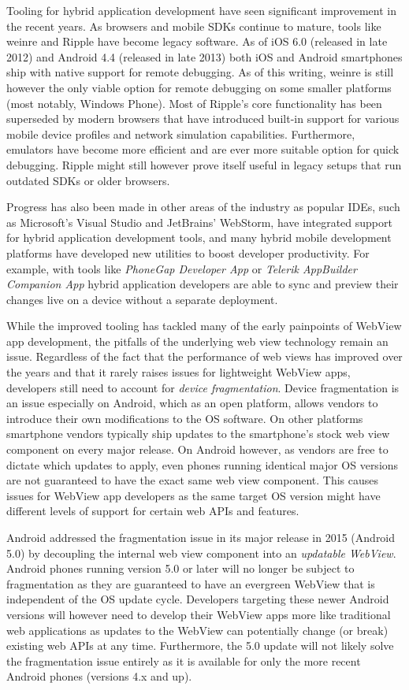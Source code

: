 \documentclass[thesis.tex]{subfiles}
\begin{document}
Tooling for hybrid application development have seen significant improvement in the recent years. As browsers and mobile SDKs continue to mature, tools like weinre and Ripple have become legacy software. As of iOS 6.0 (released in late 2012) and Android 4.4 (released in late 2013) both iOS and Android smartphones ship with native support for remote debugging. As of this writing, weinre is still however the only viable option for remote debugging on some smaller platforms (most notably, Windows Phone). Most of Ripple's core functionality has been superseded by modern browsers that have introduced built-in support for various mobile device profiles and network simulation capabilities. Furthermore, emulators have become more efficient and are ever more suitable option for quick debugging. Ripple might still however prove itself useful in legacy setups that run outdated SDKs or older browsers.

Progress has also been made in other areas of the industry as popular IDEs, such as Microsoft's Visual Studio and JetBrains' WebStorm, have integrated support for hybrid application development tools, and many hybrid mobile development platforms have developed new utilities to boost developer productivity. For example, with tools like \textit{PhoneGap Developer App} or \textit{Telerik AppBuilder Companion App} hybrid application developers are able to sync and preview their changes live on a device without a separate deployment.

While the improved tooling has tackled many of the early painpoints of WebView app development, the pitfalls of the underlying web view technology remain an issue. Regardless of the fact that the performance of web views has improved over the years and that it rarely raises issues for lightweight WebView apps, developers still need to account for \textit{device fragmentation}. Device fragmentation is an issue especially on Android, which as an open platform, allows vendors to introduce their own modifications to the OS software. On other platforms smartphone vendors typically ship updates to the smartphone's stock web view component on every major release. On Android however, as vendors are free to dictate which updates to apply, even phones running identical major OS versions are not guaranteed to have the exact same web view component. This causes issues for WebView app developers as the same target OS version might have different levels of support for certain web APIs and features.

Android addressed the fragmentation issue in its major release in 2015 (Android 5.0) by decoupling the internal web view component into an \textit{updatable WebView}. Android phones running version 5.0 or later will no longer be subject to fragmentation as they are guaranteed to have an evergreen WebView that is independent of the OS update cycle. Developers targeting these newer Android  versions will however need to develop their WebView apps more like traditional web applications as updates to the WebView can potentially change (or break) existing web APIs at any time. Furthermore, the 5.0 update will not likely solve the fragmentation issue entirely as it is available for only the more recent Android phones (versions 4.x and up).
\end{document}
